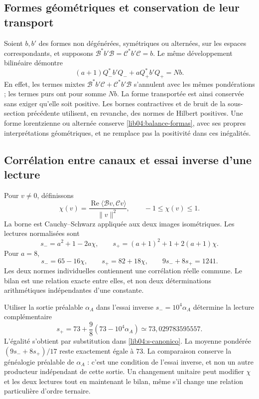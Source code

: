 \subsection{Formes géométriques et conservation de leur transport}
\label{lib04:formas}

Soient \(b,b'\) des formes non dégénérées, symétriques ou alternées, sur
les espaces correspondants, et supposons
\(\mathcal B^*b'\mathcal B=\mathcal C^*b'\mathcal C=b\).
Le même développement bilinéaire démontre
\begin{equation}
 (a+1)Q_-^*b'Q_-+aQ_+^*b'Q_+=Nb.
 \label{lib04:balance-formas}
\end{equation}
En effet, les termes mixtes
\(\mathcal B^*b'\mathcal C+\mathcal C^*b'\mathcal B\) s’annulent
avec les mêmes pondérations ; les termes purs ont pour somme \(Nb\).
La forme transportée est ainsi conservée sans exiger qu’elle soit positive.
Les bornes contractives et de bruit de la sous-section précédente utilisent,
en revanche, des normes de Hilbert positives. Une forme lorentzienne ou
alternée conserve \eqref{lib04:balance-formas}, avec ses propres
interprétations géométriques, et ne remplace pas la positivité dans ces
inégalités.

\subsection{Corrélation entre canaux et essai inverse d’une lecture}
\label{lib04:correlacion}

Pour \(v\neq0\), définissons
\begin{equation}
 \chi(v)=\frac{\operatorname{Re}\langle\mathcal Bv,\mathcal Cv\rangle}
                      {\|v\|^2},\qquad -1\leq\chi(v)\leq1.
 \label{lib04:chi}
\end{equation}
La borne est Cauchy--Schwarz appliquée aux deux images isométriques.
Les lectures normalisées sont
\begin{equation}
 s_-=a^2+1-2a\chi,\qquad
 s_+=(a+1)^2+1+2(a+1)\chi.
 \label{lib04:s-pm}
\end{equation}
Pour \(a=8\),
\begin{equation}
 s_-=65-16\chi,\qquad s_+=82+18\chi,\qquad
 9s_-+8s_+=1241.
 \label{lib04:s-canonico}
\end{equation}
Les deux normes individuelles contiennent une corrélation réelle commune. Le bilan est une relation exacte entre elles, et non deux déterminations arithmétiques indépendantes d'une constante.

Utiliser la sortie préalable \(\alpha_A\) dans l’essai inverse
\(s_-=10^4\alpha_A\) détermine la lecture complémentaire
\begin{equation}
 s_+=73+\frac98(73-10^4\alpha_A)
       \simeq73{,}029783595557.
 \label{lib04:ensayo-alpha}
\end{equation}
L’égalité s’obtient par substitution dans
\eqref{lib04:s-canonico}. La moyenne pondérée
\((9s_-+8s_+)/17\) reste exactement égale à \(73\).
La comparaison conserve la généalogie préalable de \(\alpha_A\) : c’est
une condition de l’essai inverse, et non un autre producteur indépendant de
cette sortie. Un changement unitaire peut modifier \(\chi\) et les deux
lectures tout en maintenant le bilan, même s’il change une relation particulière
d’ordre ternaire.

